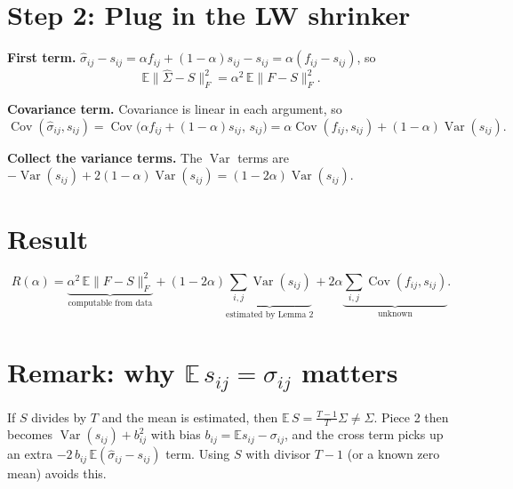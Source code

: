 \documentclass[11pt]{article}
\begin{document}
\section*{Step 2: Plug in the LW shrinker}

\textbf{First term.} $\hat\sigma_{ij}-s_{ij} = \alpha f_{ij} + (1-\alpha)s_{ij} - s_{ij} = \alpha(f_{ij}-s_{ij})$, so
\[
\mathbb{E}\|\hat\Sigma-S\|_F^2 = \alpha^2\,\mathbb{E}\|F-S\|_F^2 .
\]

\textbf{Covariance term.} Covariance is linear in each argument, so
\[
\operatorname{Cov}(\hat\sigma_{ij},s_{ij})
= \operatorname{Cov}\big(\alpha f_{ij}+(1-\alpha)s_{ij},\,s_{ij}\big)
= \alpha\operatorname{Cov}(f_{ij},s_{ij}) + (1-\alpha)\operatorname{Var}(s_{ij}).
\]

\textbf{Collect the variance terms.} The $\operatorname{Var}$ terms are
$-\operatorname{Var}(s_{ij}) + 2(1-\alpha)\operatorname{Var}(s_{ij}) = (1-2\alpha)\operatorname{Var}(s_{ij})$.

\section*{Result}
\[
R(\alpha) =
\underbrace{\alpha^2\,\mathbb{E}\|F-S\|_F^2}_{\text{computable from data}}
+ (1-2\alpha)\underbrace{\sum_{i,j}\operatorname{Var}(s_{ij})}_{\text{estimated by Lemma 2}}
+ 2\alpha\underbrace{\sum_{i,j}\operatorname{Cov}(f_{ij},s_{ij})}_{\text{unknown}} .
\]

\section*{Remark: why $\mathbb{E}\,s_{ij}=\sigma_{ij}$ matters}
If $S$ divides by $T$ and the mean is estimated, then $\mathbb{E}\,S = \tfrac{T-1}{T}\Sigma \neq \Sigma$.
Piece 2 then becomes $\operatorname{Var}(s_{ij}) + b_{ij}^2$ with bias $b_{ij}=\mathbb{E}s_{ij}-\sigma_{ij}$,
and the cross term picks up an extra $-2\,b_{ij}\,\mathbb{E}(\hat\sigma_{ij}-s_{ij})$ term.
Using $S$ with divisor $T-1$ (or a known zero mean) avoids this.
\end{document}
